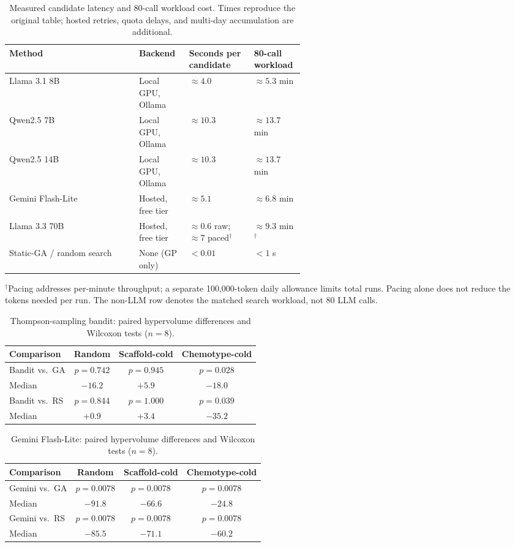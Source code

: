 \begin{table}[htbp]
\caption{Measured candidate latency and 80-call workload cost. Times reproduce the original table; hosted retries, quota delays, and multi-day accumulation are additional.}
\label{tab:original-6}
\centering
\small
\begin{tabularx}{\linewidth}{@{}X p{0.17\linewidth} p{0.22\linewidth} p{0.17\linewidth}@{}}
\toprule
Method & Backend & Seconds per candidate & 80-call workload \\
\midrule
Llama 3.1 8B & Local GPU, Ollama & $\approx4.0$ & $\approx5.3$ min \\
Qwen2.5 7B & Local GPU, Ollama & $\approx10.3$ & $\approx13.7$ min \\
Qwen2.5 14B & Local GPU, Ollama & $\approx10.3$ & $\approx13.7$ min \\
Gemini Flash-Lite & Hosted, free tier & $\approx5.1$ & $\approx6.8$ min \\
Llama 3.3 70B & Hosted, free tier & $\approx0.6$ raw; $\approx7$ paced$^\dagger$ & $\approx9.3$ min$^\dagger$ \\
Static-GA / random search & None (GP only) & $<0.01$ & $<1$ s \\
\bottomrule
\end{tabularx}
\par\footnotesize $^\dagger$Pacing addresses per-minute throughput; a separate 100,000-token daily allowance limits total runs. Pacing alone does not reduce the tokens needed per run. The non-LLM row denotes the matched search workload, not 80 LLM calls.
\end{table}

\begin{table}[htbp]
\caption{Thompson-sampling bandit: paired hypervolume differences and Wilcoxon tests ($n=8$).}
\label{tab:original-7}
\centering
\begin{tabular}{@{}lccc@{}}
\toprule
Comparison & Random & Scaffold-cold & Chemotype-cold \\
\midrule
Bandit vs.\ GA & $p=0.742$ & $p=0.945$ & $p=0.028$ \\
Median & $-16.2$ & $+5.9$ & $-18.0$ \\
Bandit vs.\ RS & $p=0.844$ & $p=1.000$ & $p=0.039$ \\
Median & $+0.9$ & $+3.4$ & $-35.2$ \\
\bottomrule
\end{tabular}
\end{table}

\begin{table}[htbp]
\caption{Gemini Flash-Lite: paired hypervolume differences and Wilcoxon tests ($n=8$).}
\label{tab:original-8}
\centering
\begin{tabular}{@{}lccc@{}}
\toprule
Comparison & Random & Scaffold-cold & Chemotype-cold \\
\midrule
Gemini vs.\ GA & $p=0.0078$ & $p=0.0078$ & $p=0.0078$ \\
Median & $-91.8$ & $-66.6$ & $-24.8$ \\
Gemini vs.\ RS & $p=0.0078$ & $p=0.0078$ & $p=0.0078$ \\
Median & $-85.5$ & $-71.1$ & $-60.2$ \\
\bottomrule
\end{tabular}
\end{table}